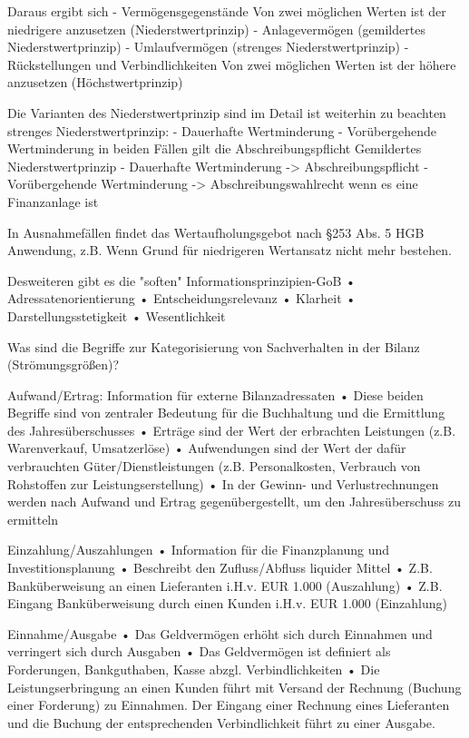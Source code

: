 Daraus ergibt sich
- Vermögensgegenstände
   Von zwei möglichen Werten ist der niedrigere anzusetzen
   (Niederstwertprinzip)
   - Anlagevermögen
     (gemildertes Niederstwertprinzip)
   - Umlaufvermögen
     (strenges Niederstwertprinzip)
- Rückstellungen und Verbindlichkeiten
   Von zwei möglichen Werten ist der höhere
   anzusetzen (Höchstwertprinzip) 

Die Varianten des Niederstwertprinzip sind im Detail  ist weiterhin zu beachten
strenges Niederstwertprinzip:
- Dauerhafte Wertminderung
- Vorübergehende Wertminderung
in beiden Fällen gilt die Abschreibungspflicht 
Gemildertes Niederstwertprinzip
- Dauerhafte Wertminderung -> Abschreibungspflicht 
- Vorübergehende Wertminderung -> Abschreibungswahlrecht wenn es eine Finanzanlage ist

In Ausnahmefällen findet das Wertaufholungsgebot nach §253 Abs. 5 HGB Anwendung, z.B.
Wenn Grund für niedrigeren Wertansatz nicht mehr bestehen.

Desweiteren gibt es die "soften"
Informationsprinzipien-GoB
• Adressatenorientierung
• Entscheidungsrelevanz
• Klarheit
• Darstellungsstetigkeit
• Wesentlichkeit


Was sind die Begriffe zur Kategorisierung von Sachverhalten in der Bilanz (Strömungsgrößen)?

Aufwand/Ertrag: 
Information für externe Bilanzadressaten
• Diese beiden Begriffe sind von zentraler Bedeutung für die Buchhaltung und die Ermittlung des Jahresüberschusses
• Erträge sind der Wert der erbrachten Leistungen (z.B. Warenverkauf, Umsatzerlöse)
• Aufwendungen sind der Wert der dafür verbrauchten Güter/Dienstleistungen (z.B. Personalkosten, Verbrauch von Rohstoffen zur Leistungserstellung)
• In der Gewinn- und Verlustrechnungen werden nach Aufwand und Ertrag gegenübergestellt, um den Jahresüberschuss zu ermitteln

Einzahlung/Auszahlungen
• Information für die Finanzplanung und Investitionsplanung
• Beschreibt den Zufluss/Abfluss liquider Mittel
• Z.B. Banküberweisung an einen Lieferanten i.H.v. EUR 1.000 (Auszahlung)
• Z.B. Eingang Banküberweisung durch einen Kunden i.H.v. EUR 1.000 (Einzahlung)

Einnahme/Ausgabe
• Das Geldvermögen erhöht sich durch Einnahmen und verringert sich durch Ausgaben
• Das Geldvermögen ist definiert als Forderungen, Bankguthaben, Kasse abzgl. Verbindlichkeiten
• Die Leistungserbringung an einen Kunden führt mit Versand der Rechnung (Buchung einer Forderung) zu Einnahmen. Der Eingang einer Rechnung eines
Lieferanten und die Buchung der entsprechenden Verbindlichkeit führt zu einer Ausgabe.

